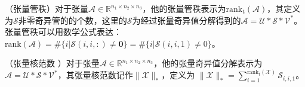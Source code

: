 \begin{definition}
	（张量管秩\cite{18}）对于张量$\mathcal{A}\in \mathbb{R}^{n_1\times n_2 \times n_3}$，他的张量管秩表示为$\mathrm{rank}_\mathrm{t}(\mathcal{A})$，其定义为$\mathcal{S}$非零奇异管的的个数，这里的$\mathcal{S}$为经过张量奇异值分解得到的$
	\mathcal{A}=\mathcal{U} \ast \mathcal{S} \ast \mathcal{V}^*	$。张量管秩可以用数学公式表达：$\mathrm{rank}(\mathcal{A})=\#\{i|\mathcal{S}(i,i,:)\neq \textbf{0}\}=\#\{i|\mathcal{S}(i,i,1)\neq  0\}$。 
\end{definition}

\begin{definition}
	（张量核范数 \cite{34}）对于张量$\mathcal{A}\in \mathbb{R}^{n_1\times n_2 \times n_3}$，他的张量奇异值分解表示为 $\mathcal{A}=\mathcal{U} \ast \mathcal{S} \ast \mathcal{V}^*$，其张量核范数记作$ \|\mathcal{X}\|_{*} $，定义为 $\|\mathcal{X}\|_*=\sum_{i=1}^{\mathrm{rank}_t(\mathcal{X})}\mathcal{S}_{i,i,1}$。 
\end{definition}






